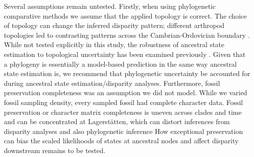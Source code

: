 \documentclass[11pt, a4paper]{article}
\newcommand{\ase}{ancestral state estimation }
\begin{document}

Several assumptions remain untested.
Firstly, when using phylogenetic comparative methods we assume that the applied topology is correct. 
The choice of topology can change the inferred disparity pattern; different arthropod topologies led to contrasting patterns across the Cambrian-Ordovician boundary \citep{lofgren2003morphological}.
While not tested explicitly in this study, the robustness of ancestral state estimation to topological uncertainty has been examined previously \citep{hanson2010robustness, duchene2015phylogenetic}.
Given that a phylogeny is essentially a model-based prediction in the same way \ase is, we recommend that phylogenetic uncertainty be accounted for during ancestral state estimation/disparity analyses. %
Furthermore, fossil preservation completeness was an assumption we did not model.
While we varied fossil sampling density, every sampled fossil had complete character data.
Fossil preservation or character matrix completeness is uneven across clades and time and can be concentrated at Lagerst{\"a}tten, which can distort inferences from disparity analyses \citep{butler2012geological,flannery2019does} and also phylogenetic inference \citep{sansom2010non,woolley2024quantifying}
How exceptional preservation can bias the scaled likelihoods of states at ancestral nodes and affect disparity downstream remains to be tested.
\end{document}
